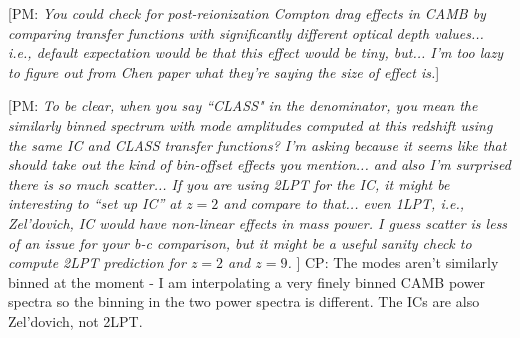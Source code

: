\documentclass[]{article}
\def\pvm#1{[PM: {\it #1}] }
\newcommand{\CP}[1]{{\color{red}CP: #1}}
\begin{document}
\pvm{You could check for post-reionization Compton drag effects in CAMB by
comparing transfer functions with significantly different optical depth
values... i.e., default expectation would be that this effect would be tiny,
but... I'm too lazy to figure out from Chen paper what they're saying the
size of effect is.} 

\pvm{To be clear, when you say ``CLASS" in the denominator, you mean the
similarly binned spectrum with mode amplitudes computed at this
redshift using the same IC and CLASS transfer functions?
I'm asking because it seems like that
should take out the kind of bin-offset effects you mention... and also I'm
surprised there is so much scatter... If you are using 2LPT for the IC, it
might be interesting to ``set up IC'' at $z=2$ and compare to that... even
1LPT, i.e., Zel'dovich, IC would have non-linear effects in mass power. I guess
scatter is less of an issue for your b-c comparison, but it might be a useful
sanity check to compute 2LPT prediction for $z=2$ and $z=9$. }
\CP{The modes aren't similarly binned at the moment - I am interpolating a very finely
binned CAMB power spectra so the binning in the two power spectra is different.
The ICs are also Zel'dovich, not 2LPT.}



\end{document}
